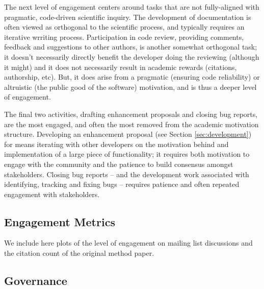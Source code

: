 The next level of engagement centers around tasks that are not fully-aligned
with pragmatic, code-driven scientific inquiry.  The development of
documentation is often viewed as orthogonal to the scientific process, and
typically requires an iterative wrriting process.  Participation in code
review, providing comments, feedback and suggestions to other authors, is
another somewhat orthogonal task; it doesn't necessarily directly benefit the
developer doing the reviewing (although it might) and it does not necessarily
result in academic rewards (citations, authorship, etc).  But, it does arise
from a pragmatic (ensuring code reliability) or altruistic (the public good of
the software) motivation, and is thus a deeper level of engagement.

The final two activities, drafting enhancement proposals and closing bug
reports, are the most engaged, and often the most removed from the academic
motivation structure.  Developing an enhancement proposal (see Section
\ref{sec:development}) for \yt{} means iterating with other developers on the
motivation behind and implementation of a large piece of functionality; it
requires both motivation to engage with the community and the patience to build
consensus amongst stakeholders.  Closing bug reports -- and the development
work associated with identifying, tracking and fixing bugs -- requires patience
and often repeated engagement with stakeholders.

\subsection{Engagement Metrics}

We include here plots of the level of engagement on mailing list discussions
and the citation count of the original method paper.

\subsection{Governance}


